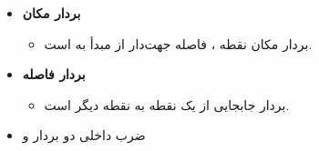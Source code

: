 \begin{ELunit}

\begin{itemize}
\tightlist
\item
  \textbf{بردار مکان}

  \begin{itemize}
  \tightlist
  \item
    بردار مکان نقطه ، فاصله جهت‌دار از مبدأ به  است.
  \end{itemize}
\end{itemize}


\begin{itemize}
\tightlist
\item
  \textbf{بردار فاصله}

  \begin{itemize}
  \tightlist
  \item
    بردار جابجایی از یک نقطه به نقطه دیگر است.
  \end{itemize}
\end{itemize}




\end{ELunit}

\begin{ELjoin}

\begin{itemize}
\tightlist
\item
  ضرب داخلی دو بردار  و 
\end{itemize}

\begin{ELimportant}{}


\end{ELimportant}

\end{ELjoin}


